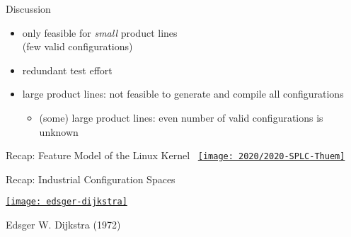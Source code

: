 \begin{frame}{\myframetitle{}}
\begin{mycolumns}[forget]
\begin{note}{Discussion}
\begin{itemize}
				\setlength\itemsep{.5em}
				\item only feasible for \emph{small} product lines\\(few valid configurations)
				\item redundant test effort
				\vspace*{1ex}
				\item large product lines: not feasible to generate and compile all configurations
				\begin{itemize}
					\item (some) large product lines: even number of valid configurations is unknown
				\end{itemize}
			\end{itemize}
		\end{note}
	\end{mycolumns}
\end{frame}

\begin{frame}{Recap: Feature Model of the Linux Kernel}
	\vspace{1mm}~\hspace{-15mm}\href{https://dl.acm.org/doi/abs/10.1145/3382025.3414943}{\texttt{[image: 2020/2020-SPLC-Thuem]}}
\end{frame}

\begin{frame}{\myframetitle{}}
	\begin{mycolumns}[widths={60}]
		\begin{exampletight}{Recap: Industrial Configuration Spaces\mysource{\lectureintroduction}}
			\centering{}
		\end{exampletight}
	\mynextcolumn
		\vspace{-7mm}
		\href{https://commons.wikimedia.org/wiki/File:Edsger_Wybe_Dijkstra.jpg}{\texttt{[image: edsger-dijkstra]}}
		\vspace{-7mm}
		
		\begin{note}{Edsger W. Dijkstra (1972)}
			\mysource{\thehumbleprogrammer}
		\end{note}
	\end{mycolumns}
\end{frame}


